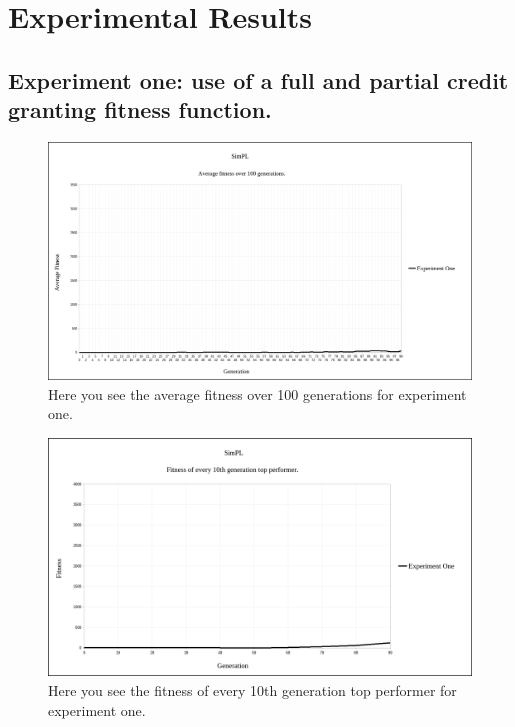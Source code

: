 \documentclass[a4paper,10pt]{article}
\begin{document}
\section{Experimental Results}

\subsection{Experiment one: use of a full and partial credit granting fitness function.}

\begin{figure}[H]  
  \centering
  \includegraphics[width=1\textwidth]{figures/exp1_avg_fit.png}
  \caption{Here you see the average fitness over 100 generations for experiment one.}
  \label{fig:exp1_avg_fit}
\end{figure}

\begin{figure}[H]  
  \centering
  \includegraphics[width=1\textwidth]{figures/exp1_10_tops.png}
  \caption{Here you see the fitness of every 10th generation top performer for experiment one.}
  \label{fig:exp1_10_tops}
\end{figure}
\end{document}
